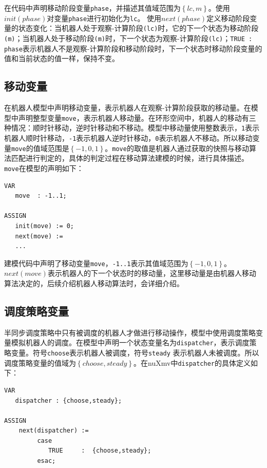 在代码中声明移动阶段变量\verb|phase|，并描述其值域范围为$\left\{lc,m\right\}$。使用$init\left(phase\right)$对变量\verb|phase|进行初始化为\verb|lc|。 使用$next\left(phase\right)$定义移动阶段变量的状态变化：当机器人处于观察-计算阶段\verb|(lc)|时，它的下一个状态为移动阶段\verb|(m)|；当机器人处于移动阶段\verb|(m)|时，下一个状态为观察-计算阶段\verb|(lc)|；\verb|TRUE : phase|表示机器人不是观察-计算阶段和移动阶段时，下一个状态时移动阶段变量的值和当前状态的值一样，保持不变。

\subsection{移动变量}
在机器人模型中声明移动变量，表示机器人在观察-计算阶段获取的移动量。在模型中声明整型变量\verb|move|，表示机器人移动量。在环形空间中，机器人的移动有三种情况：顺时针移动，逆时针移动和不移动。模型中移动量使用整数表示，\verb|1|表示机器人顺时针移动，\verb|-1|表示机器人逆时针移动，\verb|0|表示机器人不移动。所以移动变量\verb|move|的值域范围是$\left\{-1,0,1\right\}$。\verb|move|的取值是机器人通过获取的快照与移动算法匹配进行判定的，具体的判定过程在移动算法建模的时候，进行具体描述。\verb|move|在模型的声明如下：

\begin{lstlisting}
VAR
   move  : -1..1;

ASSIGN
   init(move) := 0;
   next(move) :=
   ...
\end{lstlisting}

建模代码中声明了移动变量\verb|move|，\verb|-1..1|表示其值域范围为$\left\{-1,0,1\right\}$。$next\left(move\right)$表示机器人的下一个状态时的移动量，这里移动量是由机器人移动算法决定的，后续介绍机器人移动算法时，会详细介绍。

\subsection{调度策略变量}
半同步调度策略中只有被调度的机器人才做进行移动操作，模型中使用调度策略变量模拟机器人的调度。在模型中声明一个状态变量名为\verb|dispatcher|，表示调度策略变量。符号\verb|choose|表示机器人被调度，符号\verb|steady| 表示机器人未被调度。所以调度策略变量的值域为$\left\{choose,steady\right\}$。在nuXmv中\verb|dispatcher|的具体定义如下：

\begin{lstlisting}
VAR
   dispatcher : {choose,steady};

ASSIGN
    next(dispatcher) :=
         case
            TRUE     :  {choose,steady};
         esac;
\end{lstlisting}

